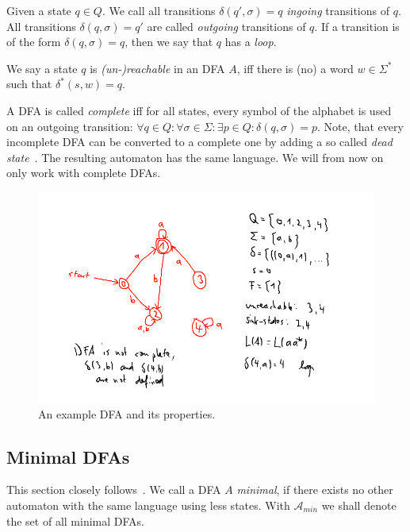 Given a state $q \in Q$. We call all transitions $\delta(q', \sigma) = q$ \emph{ingoing} transitions of $q$. All transitions $\delta(q, \sigma) = q'$ are called \emph{outgoing} transitions of $q$. If a transition is of the form $\delta(q, \sigma) = q$, then we say that $q$ has a \emph{loop}.

\begin{definition}\label{ch:1:unreachable-states}
	We say a state $q$ is \emph{(un-)reachable} in an DFA $A$, iff there is (no) a word $w \in \Sigma^*$ such that $\delta^*(s, w) = q$.
\end{definition}

A DFA is called \emph{complete} iff for all states, every symbol of the alphabet is used on an outgoing transition: $\forall q\in Q\colon \forall\sigma\in\Sigma\colon \exists p\in Q\colon \delta(q,\sigma) = p$. Note, that every incomplete DFA can be converted to a complete one by adding a so called \emph{dead state}~\cite[p. 67]{hopcroft01}. The resulting automaton has the same language. We will from now on only work with complete DFAs.

\begin{figure}
	\includegraphics[width=\linewidth]{images/dfa.png}
	\caption{An example DFA and its properties.}
	\label{fig:dfa}
\end{figure}

\subsection{Minimal DFAs}

This section closely follows~\cite[pp. 42-45]{schoening01}. We call a DFA $A$ \emph{minimal}, if there exists no other automaton with the same language using less states. With $\mathcal{A}_{min}$ we shall denote the set of all minimal DFAs.

